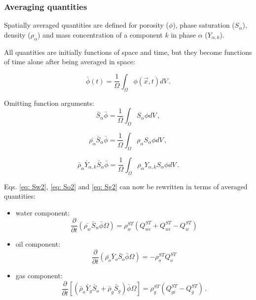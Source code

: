 \documentclass[final,authoryear,5p,twocolumn,10pt]{elsarticle}
\begin{document}
\subsubsection{Averaging quantities}

Spatially averaged quantities are defined for porosity ($\phi$), phase saturation ($S_\alpha$), density ($\rho_\alpha$) and mass concentration of a component $k$ in phase $\alpha$ ($Y_{\alpha,k}$).

All quantities are initially functions of space and time, but they become functions of time alone after being averaged in space:

\begin{equation}
\bar{\phi} (t) = \frac{1}{\Omega}\int_{\Omega}\phi \left(\vec{x},t\right) dV \, .
\end{equation}

Omitting function arguments:
\begin{equation}
\bar{S}_\alpha\bar{\phi} = \frac{1}{\Omega}\int_{\Omega}S_\alpha \phi dV \, ,
\end{equation}

\begin{equation}
\bar{\rho_\alpha}\bar{S}_\alpha \bar{\phi} = \frac{1}{\Omega}\int_{\Omega}\rho_\alpha S_\alpha \phi dV \, ,
\end{equation}

\begin{equation}
\bar{\rho}_\alpha \bar{Y}_{\alpha,k}\bar{S}_\alpha \bar{\phi} = \frac{1}{\Omega}\int_{\Omega}\rho_\alpha Y_{\alpha,k} S_\alpha \phi dV \, .
\end{equation}

Eqs. \eqref{eq: Sw2}, \eqref{eq: So2} and \eqref{eq: Sg2} can now be rewritten in terms of averaged quantities:

\begin{itemize}
\item water component:
\begin{equation}\label{eq: Sw3}
\frac{\partial}{\partial t} \left( \bar{\rho_w}\bar{S}_w\bar{\phi} \Omega \right) = \rho_w^{ST}\left(Q_{we}^{ST} + Q_{wi}^{ST}-Q_w^{ST}\right)
\end{equation}

\item oil component:
\begin{equation}\label{eq: So3}
\frac{\partial}{\partial t} \left( \bar{\rho_o}\bar{Y}_o\bar{S}_o\bar{\phi} \Omega \right) = - \rho_o^{ST}Q_o^{ST}
\end{equation}

\item gas component:
\begin{equation}\label{eq: Sg3}
\frac{\partial}{\partial t} \left[\left( \bar{\rho}_o\bar{Y}_g \bar{S}_o + \bar{\rho}_g \bar{S}_g \right) \bar{\phi} \Omega\right] =  \rho_g^{ST}(Q_{gi}^{ST}-Q_g^{ST}) \, .
\end{equation}
\end{itemize}
\end{document}
